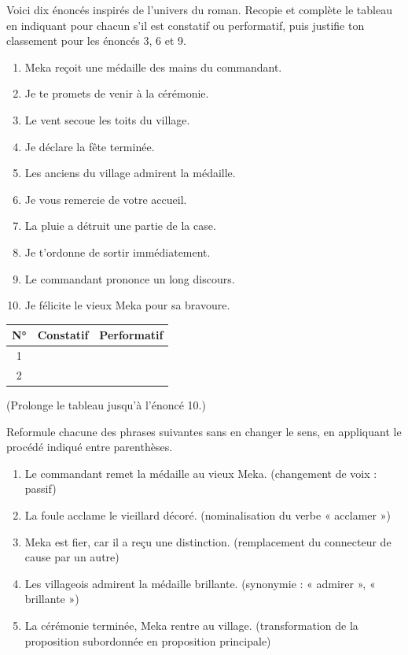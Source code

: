 \documentclass[11pt]{article}
\newcommand{\cle}[1]{{\popxbold\color{popdark}#1}}
\begin{document}
\begin{exercice}
Voici dix énoncés inspirés de l'univers du roman. Recopie et complète le tableau en indiquant pour chacun s'il est \cle{constatif} ou \cle{performatif}, puis justifie ton classement pour les énoncés 3, 6 et 9.
\begin{enumerate}
\item Meka reçoit une médaille des mains du commandant.
\item Je te promets de venir à la cérémonie.
\item Le vent secoue les toits du village.
\item Je déclare la fête terminée.
\item Les anciens du village admirent la médaille.
\item Je vous remercie de votre accueil.
\item La pluie a détruit une partie de la case.
\item Je t'ordonne de sortir immédiatement.
\item Le commandant prononce un long discours.
\item Je félicite le vieux Meka pour sa bravoure.
\end{enumerate}
\begin{center}
\begin{tabularx}{\linewidth}{|c|X|X|}\hline
\rowcolor{popblueL} \textbf{N°} & \textbf{Constatif} & \textbf{Performatif} \\ \hline
1 & & \\ \hline
2 & & \\ \hline
\end{tabularx}
\end{center}
(Prolonge le tableau jusqu'à l'énoncé 10.)
\end{exercice}

\begin{exercice}
Reformule chacune des phrases suivantes sans en changer le sens, en appliquant le procédé indiqué entre parenthèses.
\begin{enumerate}
\item Le commandant remet la médaille au vieux Meka. (changement de voix : passif)
\item La foule acclame le vieillard décoré. (nominalisation du verbe « acclamer »)
\item Meka est fier, car il a reçu une distinction. (remplacement du connecteur de cause par un autre)
\item Les villageois admirent la médaille brillante. (synonymie : « admirer », « brillante »)
\item La cérémonie terminée, Meka rentre au village. (transformation de la proposition subordonnée en proposition principale)
\end{enumerate}
\end{exercice}
\end{document}
